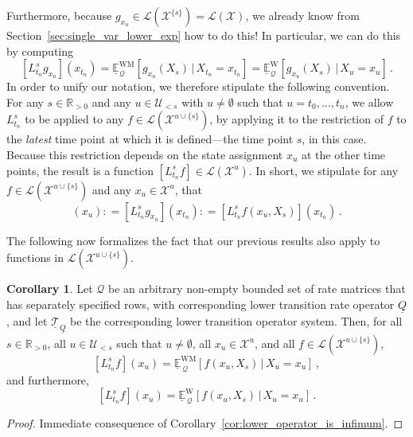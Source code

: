 \documentclass[10pt,a4paper]{paper}
\theoremstyle{definition}
\newtheorem{corollary}[theorem]{Corollary}
\newcommand{\reals}{\mathbb{R}}
\newcommand{\realspos}{\reals_{>0}}
\newcommand{\states}{\mathcal{X}}
\newcommand{\gambles}{\mathcal{L}}
\newcommand{\gamblesX}{\gambles(\states)}
\newcommand{\rateset}{\mathcal{Q}}
\newcommand{\lrate}{\underline{Q}}
\newcommand{\coloneqq}{:\!=}
\begin{document}
Furthermore, because $g_{x_u}\in\gambles(\states^{\{s\}})=\gamblesX$, we already know from Section~\ref{sec:single_var_lower_exp} how to do this! In particular, we can do this by computing 
\begin{equation*}
\left[L_{t_n}^sg_{x_u}\right](x_{t_n}) = \underline{\mathbb{E}}_\rateset^{\mathrm{WM}}[g_{x_u}(X_s)\,\vert\,X_{t_n}=x_{t_n}] = \underline{\mathbb{E}}_\rateset^{\mathrm{W}}[g_{x_u}(X_s)\,\vert\,X_u=x_u]\,.
\end{equation*}
In order to unify our notation, we therefore stipulate the following convention. For any $s\in\realspos$ and any $u\in\mathcal{U}_{<s}$ with $u\neq\emptyset$ such that $u=t_0,\ldots,t_n$, we allow $L_{t_n}^s$ to be applied to any $f\in\gambles(\states^{u\cup\{s\}})$, by applying it to the restriction of $f$ to the \emph{latest} time point at which it is defined---the time point $s$, in this case. Because this restriction depends on the state assignment $x_u$ at the other time points, the result is a function $[L_{t_n}^sf]\in\gambles(\states^u)$. In short, we stipulate for any $f\in\gambles(\states^{u\cup\{s\}})$ and any $x_u\in\states^u$, that
\begin{equation*}
[L_{t_n}^sf](x_u) \coloneqq [L_{t_n}^sg_{x_u}](x_{t_n}) \coloneqq [L_{t_n}^sf(x_u,X_s)](x_{t_n})\,.
\end{equation*}

The following now formalizes the fact that our previous results also apply to functions in $\gambles(\states^{u\cup\{s\}})$.

\begin{corollary}\label{cor:inf_works_for_single_future_var}
Let $\rateset$ be an arbitrary non-empty bounded set of rate matrices that has separately specified rows, with corresponding lower transition rate operator $\lrate$, and let $\underline{\mathcal{T}}_{\lrate}$ be the corresponding lower transition operator system. Then, for all $s\in\realspos$, all $u\in\mathcal{U}_{<s}$ such that $u\neq\emptyset$, all $x_u\in\states^u$, and all $f\in\gambles(\states^{u\cup\{s\}})$,
\begin{equation*}
\left[L_{t_n}^s f\right](x_u) = \underline{\mathbb{E}}^{\mathrm{WM}}_{\,\rateset}[f(x_u,X_s)\,\vert\,X_u=x_u]\,,
\end{equation*}
and furthermore,
\begin{equation*}
\left[L_{t_n}^s f\right](x_u) = \underline{\mathbb{E}}^\mathrm{W}_{\,\rateset}[f(x_u,X_s)\,\vert\,X_u=x_u]\,.
\end{equation*}
\end{corollary}
\begin{proof}
Immediate consequence of Corollary~\ref{cor:lower_operator_is_infimum}.
\end{proof}
\end{document}
